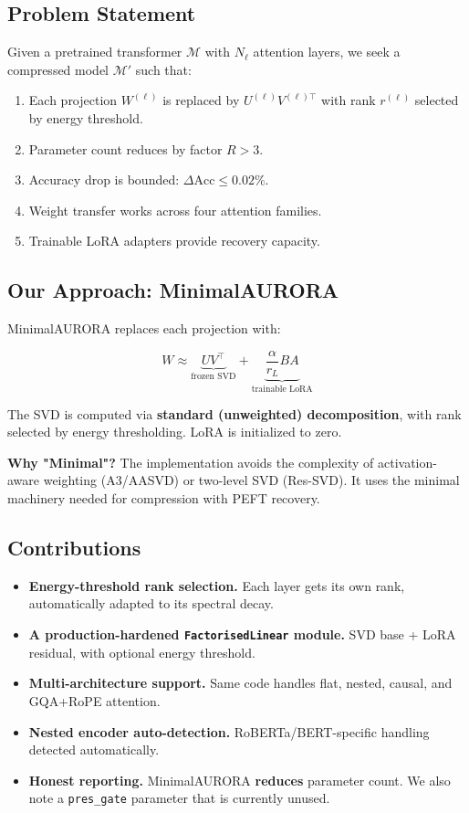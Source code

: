 \subsection{Problem Statement}

Given a pretrained transformer $\mathcal{M}$ with $N_\ell$ attention layers, 
we seek a compressed model $\mathcal{M}'$ such that:

\begin{enumerate}
\item Each projection $W^{(\ell)}$ is replaced by $U^{(\ell)} V^{(\ell)\top}$
  with rank $r^{(\ell)}$ selected by energy threshold.
\item Parameter count reduces by factor $R > 3$.
\item Accuracy drop is bounded: $\Delta\text{Acc} \leq 0.02\%$.
\item Weight transfer works across four attention families.
\item Trainable LoRA adapters provide recovery capacity.

\end{enumerate}
\subsection{Our Approach: MinimalAURORA}

MinimalAURORA replaces each projection with:

\[
W \approx \underbrace{U V^\top}_{\text{frozen SVD}} + \underbrace{\frac{\alpha}{r_L} B A}_{\text{trainable LoRA}}
\tag{1.2}
\]

The SVD is computed via \textbf{standard (unweighted) decomposition}, with rank 
selected by energy thresholding. LoRA is initialized to zero.

\textbf{Why "Minimal"?} The implementation avoids the complexity of 
activation-aware weighting (A3/AASVD) or two-level SVD (Res-SVD). It uses 
the minimal machinery needed for compression with PEFT recovery.

\subsection{Contributions}

\begin{itemize}
\item \textbf{Energy-threshold rank selection.} Each layer gets its own rank,
  automatically adapted to its spectral decay.
\item \textbf{A production-hardened \texttt{FactorisedLinear} module.} SVD base + LoRA
  residual, with optional energy threshold.
\item \textbf{Multi-architecture support.} Same code handles flat, nested, causal,
  and GQA+RoPE attention.
\item \textbf{Nested encoder auto-detection.} RoBERTa/BERT-specific handling
  detected automatically.
\item \textbf{Honest reporting.} MinimalAURORA \textbf{reduces} parameter count. We also
  note a \texttt{pres\_gate} parameter that is currently unused.

\end{itemize}
